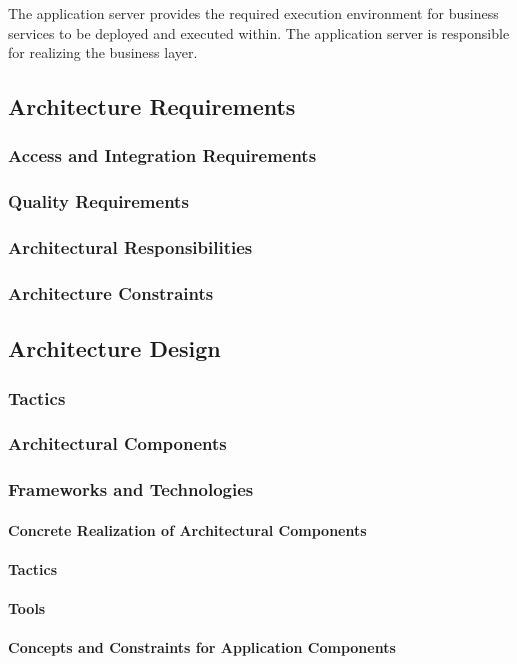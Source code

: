 The application server provides the required execution environment for business
services to be deployed and executed within. The application server is responsible
for realizing the business layer.

\subsection{Architecture Requirements}
\subsubsection{Access and Integration Requirements}
\subsubsection{Quality Requirements}
\subsubsection{Architectural Responsibilities}
\subsubsection{Architecture Constraints}
\subsection{Architecture Design}
\subsubsection{Tactics}
\subsubsection{Architectural Components}
\subsubsection{Frameworks and Technologies}
\paragraph{Concrete Realization of Architectural Components}
\paragraph{Tactics}
\paragraph{Tools}
\paragraph{Concepts and Constraints for Application Components}